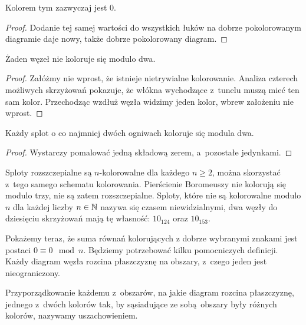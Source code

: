 Kolorem tym zazwyczaj jest $0$.

\begin{proof}
    Dodanie tej samej wartości do wszystkich łuków na dobrze pokolorowanym diagramie daje nowy, także dobrze pokolorowany diagram.
\end{proof}

\begin{proposition}
    \label{no_knots_colours_mod_two}
    Żaden węzeł nie koloruje się modulo dwa.
\end{proposition}

\begin{proof}
    Załóżmy nie wprost, że istnieje nietrywialne kolorowanie.
    Analiza czterech możliwych skrzyżowań pokazuje, że włókna wychodzące z~tunelu muszą mieć ten sam kolor.
    Przechodząc wzdłuż węzła widzimy jeden kolor, wbrew założeniu nie wprost.
\end{proof}

\begin{proposition}
    Każdy splot o co najmniej dwóch ogniwach koloruje się modula dwa.
\end{proposition}

\begin{proof}
    Wystarczy pomalować jedną składową zerem, a~pozostałe jedynkami.
\end{proof}

Sploty rozszczepialne są $n$-kolorowalne dla każdego $n \ge 2$, można skorzystać z~tego samego schematu kolorowania.
Pierścienie Boromeuszy nie kolorują się modulo trzy, nie są zatem rozszczepialne.
Sploty, które nie są kolorowalne modulo $n$ dla każdej liczby $n \in \mathbb N$ nazywa się czasem niewidzialnymi, dwa węzły do dziesięciu skrzyżowań mają tę własność: $10_{124}$ oraz $10_{153}$.

Pokażemy teraz, że suma równań kolorujących z dobrze wybranymi znakami jest postaci $0 \equiv 0 \mod n$.
Będziemy potrzebować kilku pomocniczych definicji.
Każdy diagram węzła rozcina płaszczyznę na obszary, z~czego jeden jest nieograniczony.

\begin{definition}[uszachowienie]
    Przyporządkowanie każdemu z~obszarów, na jakie diagram rozcina płaszczyznę, jednego z~dwóch kolorów tak, by sąsiadujące ze sobą obszary były różnych kolorów, nazywamy uszachowieniem.
\end{definition}

